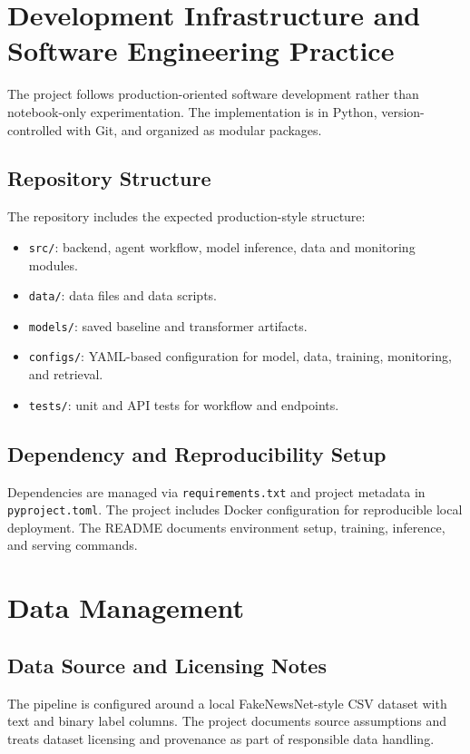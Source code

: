 \documentclass[11pt,a4paper]{article}
\begin{document}
\section{Development Infrastructure and Software Engineering Practice}
The project follows production-oriented software development rather than notebook-only experimentation. The implementation is in Python, version-controlled with Git, and organized as modular packages.

\subsection{Repository Structure}
The repository includes the expected production-style structure:
\begin{itemize}[leftmargin=1.2em]
  \item \texttt{src/}: backend, agent workflow, model inference, data and monitoring modules.
  \item \texttt{data/}: data files and data scripts.
  \item \texttt{models/}: saved baseline and transformer artifacts.
  \item \texttt{configs/}: YAML-based configuration for model, data, training, monitoring, and retrieval.
  \item \texttt{tests/}: unit and API tests for workflow and endpoints.
\end{itemize}

\subsection{Dependency and Reproducibility Setup}
Dependencies are managed via \texttt{requirements.txt} and project metadata in \texttt{pyproject.toml}. The project includes Docker configuration for reproducible local deployment. The README documents environment setup, training, inference, and serving commands.

\section{Data Management}
\subsection{Data Source and Licensing Notes}
The pipeline is configured around a local FakeNewsNet-style CSV dataset with text and binary label columns. The project documents source assumptions and treats dataset licensing and provenance as part of responsible data handling.
\end{document}
